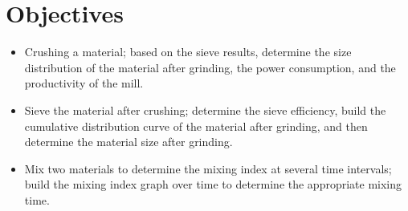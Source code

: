 \section{Objectives}
\begin{itemize}
    \item Crushing a material; based on the sieve results, determine the size distribution of the material after grinding, the power consumption, and the productivity of the mill.
    \item Sieve the material after crushing; determine the sieve efficiency, build the cumulative distribution curve of the material after grinding, and then determine the material size after grinding.
    \item Mix two materials to determine the mixing index at several time intervals; build the mixing index graph over time to determine the appropriate mixing time.
\end{itemize}

